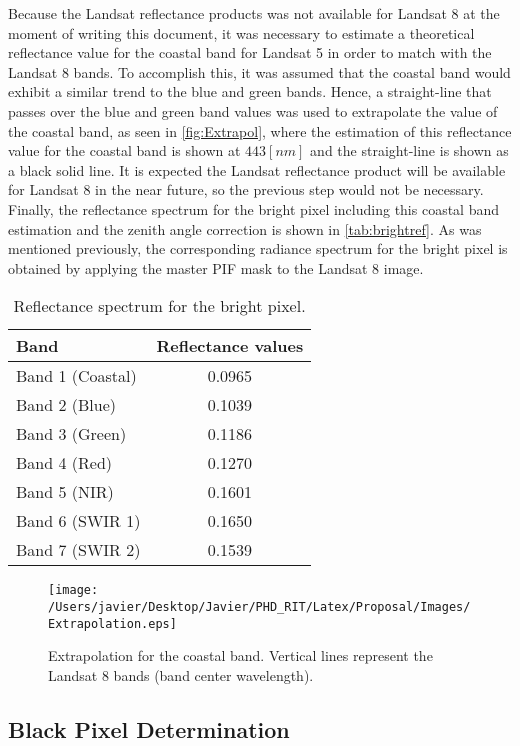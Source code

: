 \documentclass[]{spie}  %
\begin{document}
Because the Landsat reflectance products was not available for Landsat 8 at the moment of writing this document, it was necessary to estimate a theoretical reflectance value for the coastal band for Landsat 5 in order to match with the Landsat 8 bands. To accomplish this, it was assumed that the coastal band would exhibit a similar trend to the blue and green bands. Hence, a straight-line that passes over the blue and green band values was used to extrapolate the value of the coastal band, as seen in \autoref{fig:Extrapol}, where the estimation of this reflectance value for the coastal band is shown at $443 [nm]$ and the straight-line is shown as a black solid line. It is expected the Landsat reflectance product will be available for Landsat 8 in the near future, so the previous step would not be necessary. Finally, the reflectance spectrum for the bright pixel including this coastal band estimation and the zenith angle correction is shown in \autoref{tab:brightref}. As was mentioned previously, the corresponding radiance spectrum for the bright pixel is obtained by applying the master PIF mask to the Landsat 8 image.
\vspace{.5cm}
\begin{table}[!ht]
\caption{ Reflectance spectrum for the bright pixel. \label{tab:brightref} } 
\centering
\begin{tabular}{l|c} 
 \bfseries{Band} & \bfseries{Reflectance values}\\ \hline \hline
 Band 1 (Coastal) 	&  0.0965 \\
 Band 2 (Blue) 		&  0.1039 \\
 Band 3 (Green) 	&  0.1186 \\
 Band 4 (Red) 		&  0.1270 \\
 Band 5 (NIR) 		&  0.1601 \\
 Band 6 (SWIR 1) 	&  0.1650 \\ 
 Band 7 (SWIR 2) 	&  0.1539 \\ 
 \end{tabular}
\end{table}

\begin{figure}[htb]
  	\centering
  	\texttt{[image: /Users/javier/Desktop/Javier/PHD\_RIT/Latex/Proposal/Images/Extrapolation.eps]}
  \caption{Extrapolation for the coastal band. Vertical lines represent the Landsat 8 bands (band center wavelength). \label{fig:Extrapol} } 
\end{figure}

\subsection{Black Pixel Determination}
\end{document}
